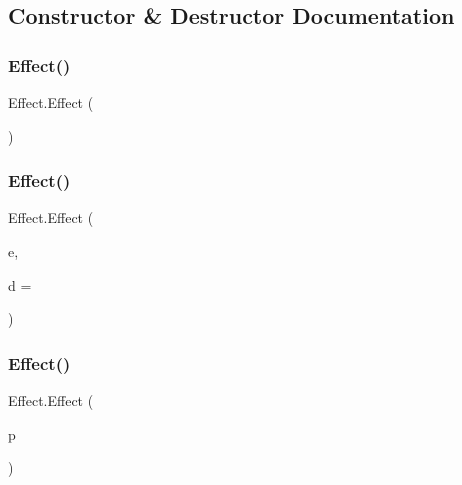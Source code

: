 \subsection{Constructor \& Destructor Documentation}
\mbox{\label{class_effect_a426033488b51897723a6aa15d1e66415}} 
\subsubsection{\texorpdfstring{Effect()}{Effect()}\hspace{0.1cm}{\footnotesize\ttfamily [1/3]}}
{\footnotesize\ttfamily Effect.\+Effect (\begin{DoxyParamCaption}{ }\end{DoxyParamCaption})}

\mbox{\label{class_effect_af2775716fce582c0a621f6c68ddb8574}} 
\subsubsection{\texorpdfstring{Effect()}{Effect()}\hspace{0.1cm}{\footnotesize\ttfamily [2/3]}}
{\footnotesize\ttfamily Effect.\+Effect (\begin{DoxyParamCaption}\item[{\mbox{\hyperlink{class_effect_a28d85888db94ec53ee9cb75e9706f6e4}{Effect\+Type}}}]{e,  }\item[{int}]{d = {} }\end{DoxyParamCaption})}

\mbox{\label{class_effect_afc3ee0f70107f501148217c076092f40}} 
\subsubsection{\texorpdfstring{Effect()}{Effect()}\hspace{0.1cm}{\footnotesize\ttfamily [3/3]}}
{\footnotesize\ttfamily Effect.\+Effect (\begin{DoxyParamCaption}\item[{\mbox{\hyperlink{class_effect_a84f32661374cee093139535ae75c58ad}{Preset}}}]{p }\end{DoxyParamCaption})}



